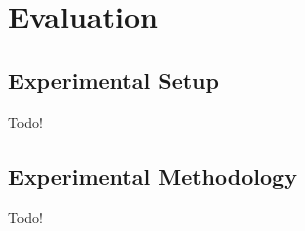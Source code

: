 \section{Evaluation}\label{sec:evaluation}

\subsection{Experimental Setup}

Todo!

\subsection{Experimental Methodology}

Todo!
